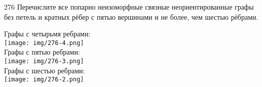 \begin{task}{276}
	Перечислите все попарно неизоморфные связные неориентированные графы без петель и кратных рёбер с пятью вершинами и не более, чем шестью рёбрами.
\end{task}

\begin{solution} 
    Графы с четырьмя ребрами: \\
	\texttt{[image: img/276-4.png]} \\
	Графы с пятью ребрами: \\
	\texttt{[image: img/276-3.png]} \\
	Графы с шестью ребрами: \\
    \texttt{[image: img/276-2.png]} 
\end{solution}